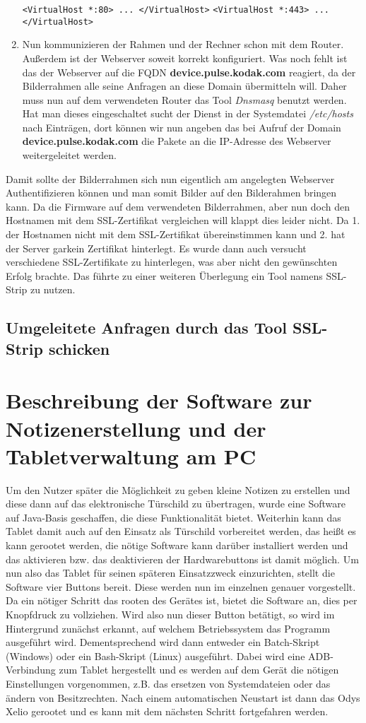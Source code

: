 \begin{flushleft}
\begin{enumerate}
      \verb|<VirtualHost *:80> ... </VirtualHost>|
      \verb|<VirtualHost *:443> ... </VirtualHost>|
      \item Nun kommunizieren der Rahmen und der Rechner schon mit dem Router. Außerdem ist der Webserver soweit korrekt konfiguriert. Was noch fehlt ist das der Webserver auf die FQDN \textbf{device.pulse.kodak.com} reagiert, da der Bilderrahmen alle seine Anfragen an diese Domain übermitteln will. Daher muss nun auf dem verwendeten Router das Tool \textit{Dnsmasq} benutzt werden. Hat man dieses eingeschaltet sucht der Dienst in der Systemdatei \textit{/etc/hosts} nach Einträgen, dort können wir nun angeben das bei Aufruf der Domain \textbf{device.pulse.kodak.com} die Pakete an die IP-Adresse des Webserver weitergeleitet werden.
    \end{enumerate}
    Damit sollte der Bilderrahmen sich nun eigentlich am angelegten Webserver Authentifizieren können und man somit Bilder auf den Bilderahmen bringen kann. Da die Firmware auf dem verwendeten Bilderrahmen, aber nun doch den Hostnamen mit dem SSL-Zertifikat vergleichen will klappt dies leider nicht. Da 1. der Hostnamen nicht mit dem SSL-Zertifikat übereinstimmen kann und 2. hat der Server garkein Zertifikat hinterlegt. Es wurde dann auch versucht verschiedene SSL-Zertifikate zu hinterlegen, was aber nicht den gewünschten Erfolg brachte. Das führte zu einer weiteren Überlegung ein Tool namens SSL-Strip zu nutzen.
  \subsection{Umgeleitete Anfragen durch das Tool SSL-Strip schicken}

\section{Beschreibung der Software zur Notizenerstellung und der Tabletverwaltung am PC}
Um den Nutzer später die Möglichkeit zu geben kleine Notizen zu erstellen und diese dann auf das elektronische Türschild zu übertragen, wurde eine Software auf Java-Basis geschaffen, die diese Funktionalität bietet. Weiterhin kann das Tablet damit auch auf den Einsatz als Türschild vorbereitet werden, das heißt es kann gerootet werden, die nötige Software kann darüber installiert werden und das aktivieren bzw. das deaktivieren der Hardwarebuttons ist damit möglich. 
Um nun also das Tablet für seinen späteren Einsatzzweck einzurichten, stellt die Software vier Buttons bereit. Diese werden nun im einzelnen genauer vorgestellt. 
Da ein nötiger Schritt das rooten des Gerätes ist, bietet die Software an, dies per Knopfdruck zu vollziehen. Wird also nun dieser Button betätigt, so wird im Hintergrund zunächst erkannt, auf welchem Betriebssystem das Programm ausgeführt wird. Dementsprechend wird dann entweder ein Batch-Skript (Windows) oder ein Bash-Skript (Linux) ausgeführt. Dabei wird eine ADB-Verbindung zum Tablet hergestellt und es werden auf dem Gerät die nötigen Einstellungen vorgenommen, z.B. das ersetzen von Systemdateien oder das ändern von Besitzrechten. Nach einem automatischen Neustart ist dann das Odys Xelio gerootet und es kann mit dem nächsten Schritt fortgefahren werden.


\end{flushleft}
